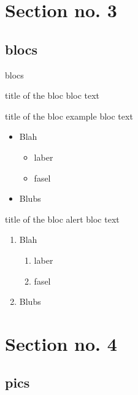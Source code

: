 \documentclass[aspectratio=169]{beamer}
\begin{document}
\section{Section no. 3}

\subsection{blocs}

\begin{frame}{blocs}
	\begin{block}{title of the bloc}
		bloc text
	\end{block}

	\begin{exampleblock}{title of the bloc}
		example bloc text
		\begin{itemize}
			\item Blah
			\begin{itemize}
				\item laber
				\item fasel
			\end{itemize}
			\item Blubs
		\end{itemize}
	\end{exampleblock}


	\begin{alertblock}{title of the bloc}
		alert bloc text
		\begin{enumerate}
			\item Blah
			\begin{enumerate}
				\item laber
				\item fasel
			\end{enumerate}
			\item Blubs
		\end{enumerate}
	\end{alertblock}
\end{frame}

\section{Section no. 4}

\subsection{pics}
\end{document}
